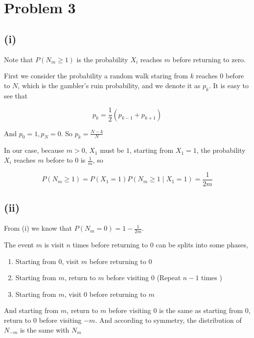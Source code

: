 \documentclass{article}
\begin{document}
\section{Problem 3}

\subsection{(i)}

Note that $P(N_m \geqslant 1)$ is the probability $X_i$ reaches $m$ before returning to zero. 

First we consider the probability a random walk staring from $k$ reaches $0$ before to $N$, which is the gambler's ruin probability, and we denote it as $p_k$. It is easy to see that 

\begin{equation}
    p_k = \frac{1}{2} (p_{k-1}+p_{k+1} )
\end{equation}

And $p_0 = 1,p_N = 0$. So $p_k = \frac{N-k}{N}$

In our case, because $m> 0$, $X_1$ must be $1$, starting from $X_1 = 1$, the probability $X_i$ reaches $m$ before to $0$ is $\frac{1}{m}$, so 

\begin{equation}
    P(N_m \geqslant 1) = P(X_1 = 1) P(N_m \geqslant 1\mid X_1 = 1)  = \frac{1}{2m}
\end{equation}


\subsection{(ii)}

From (i) we know that $ P(N_m = 0) = 1 - \frac{1}{2m}$.

The event $m$ is visit $n$ times before returning to $0$ can be splits into some phases, 

\begin{enumerate}
    \item Starting from $0$, visit $m$ before returning to $0$
    \item Starting from $m$, return to $m$ before visiting $0$ (Repeat $n-1$ times )
    \item Starting from $m$,  visit $0$ before returning to $m$
\end{enumerate}

And starting from $m$, return to $m$ before visiting $0$ is the same as starting from $0$, return to $0$ before visiting $-m$. And according to symmetry, the distribution of $N_{-m}$ is the same with $N_m$
\end{document}
